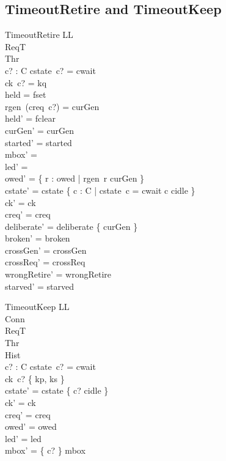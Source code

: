 \documentclass[a4paper,10pt,fleqn]{article}
\begin{document}
\subsection{TimeoutRetire and TimeoutKeep}

\begin{schema}{TimeoutRetire}
  \Delta LL \\
  \Xi ReqT \\
  \Xi Thr \\
  c? : C
\where
  cstate~c? = cwait \\
  ck~c? = kq \\
  held = fset \\
  rgen~(creq~c?) = curGen \\
  held' = fclear \\
  curGen' = curGen \\
  started' = started \\
  mbox' = \emptyset \\
  led' = \emptyset \\
  owed' = \{ r : owed | rgen~r \neq curGen \} \\
  cstate' = cstate \oplus \{ c : C | cstate~c = cwait \spot c \mapsto cidle \} \\
  ck' = ck \\
  creq' = creq \\
  deliberate' = deliberate \cup \{ curGen \} \\
  broken' = broken \\
  crossGen' = crossGen \\
  crossReq' = crossReq \\
  wrongRetire' = wrongRetire \\
  starved' = starved
\end{schema}

\begin{schema}{TimeoutKeep}
  \Delta LL \\
  \Xi Conn \\
  \Xi ReqT \\
  \Xi Thr \\
  \Xi Hist \\
  c? : C
\where
  cstate~c? = cwait \\
  ck~c? \in \{ kp, ks \} \\
  cstate' = cstate \oplus \{ c? \mapsto cidle \} \\
  ck' = ck \\
  creq' = creq \\
  owed' = owed \\
  led' = led \\
  mbox' = \{ c? \} \ndres mbox
\end{schema}
\end{document}
